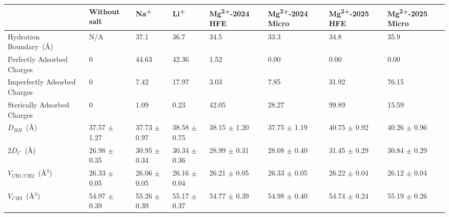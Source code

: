 \documentclass[12pt,openany,final]{book}
\newcommand{\na}{Na\textsuperscript{+}}
\newcommand{\li}{Li\textsuperscript{+}}
\newcommand{\mg}{Mg\textsuperscript{2+}}
\begin{document}
\begin{table}[H]
{\begin{tabularx}{\textwidth}{X|X|X|X|X|X|X|X|}
        \hline                     & Without salt             & \na                              & \li                & \mg{-2024} HFE     & \mg{-2024} Micro    & \mg{-2025} HFE    & \mg{-2025} Micro \\\hline
    Hydration Boundary~(\AA)       & N/A                      & 37.1                             & 36.7               & 34.5               & 33.3               & 34.8               & 35.9      \\\hline
    Perfectly Adsorbed Charges     & 0                        & 44.63                            & 42.36              & 1.52               & 0.00               & 0.00               & 0.00      \\\hline
    Imperfectly Adsorbed Charges   & 0                        & 7.42                             & 17.97              & 3.03               & 7.85               & 31.92              & 76.15     \\\hline
    Sterically Adsorbed Charges    & 0                        & 1.09                             & 0.23               & 42.05              & 28.27              & 99.89              & 15.59     \\\hline
    $D_{HH}$~(\AA)                 & 37.57 $\pm$ 1.27         & 37.73 $\pm$ 0.97                 & 38.58 $\pm$ 0.75   & 38.15 $\pm$ 1.20   & 37.75 $\pm$ 1.19   & 40.75 $\pm$ 0.92   & 40.26 $\pm$ 0.96\\\hline
    $2D_C$~(\AA)                   & 26.98 $\pm$ 0.35         & 30.95 $\pm$ 0.34                 & 30.34 $\pm$ 0.36   & 28.99 $\pm$ 0.31   & 28.08 $\pm$ 0.40   & 31.45 $\pm$ 0.29   & 30.84 $\pm$ 0.29\\\hline
    $V_{\text{CH1/CH2}}$~(\AA$^3$) & 26.33 $\pm$ 0.05         & 26.06 $\pm$ 0.05                 & 26.16 $\pm$ 0.04   & 26.21 $\pm$ 0.05   & 26.33 $\pm$ 0.05   & 26.22 $\pm$ 0.04   & 26.12 $\pm$ 0.04\\\hline
    $V_{CH3}$~(\AA$^3$)            & 54.97 $\pm$ 0.39         & 55.26 $\pm$ 0.39                 & 55.17 $\pm$ 0.37   & 54.77 $\pm$ 0.39   & 54.98 $\pm$ 0.40   & 54.74 $\pm$ 0.24   & 55.19 $\pm$ 0.26\\\hline

\end{tabularx}}
\end{table}
\end{document}

